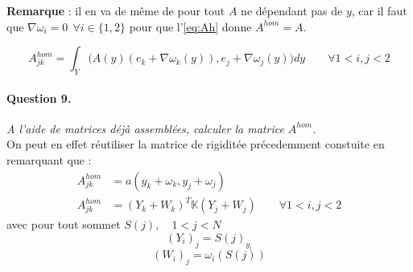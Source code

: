 \documentclass[11pt]{article}
\newcommand{\K}{\mathbb{K}}
\newcommand{\Ah}{A^{hom}}
\newcommand{\question}[2]{\paragraph{Question #1.}\textit{#2} \\}
\begin{document}
\noindent
\textbf{Remarque} : il en va de même de pour tout $A$ ne dépendant pas de $y$, car il faut que
$
  \nabla \omega_i = 0~~\forall i \in\{1,2\}
$
pour que l'\autoref{eq:Ah} donne $\Ah = A$.

\begin{equation}
  \label{eq:Ah}
  \Ah_{jk} = \int_Y \big(A(y)(e_k+\nabla \omega_k(y)), e_j+\nabla \omega_j(y)\big) dy \qquad \forall 1<i,j<2
\end{equation}

\question{9}{A l'aide de matrices déjà assemblées, calculer la matrice $\Ah$.}
On peut en effet réutiliser la matrice de rigiditée précedemment constuite en remarquant que :
\begin{align*}
  \Ah_{jk} &= a(y_k+\omega_k, y_j+\omega_j) \\
  \Ah_{jk} &= (Y_k + W_k)^T \K (Y_j + W_j) \qquad \forall 1<i,j<2
\end{align*}
avec pour tout sommet $S(j), \quad 1<j<N $
\[
  (Y_i)_j = S(j)_{y_i} 
\]
\[
  (W_i)_j = \omega_i(S(j))
\]
\end{document}
